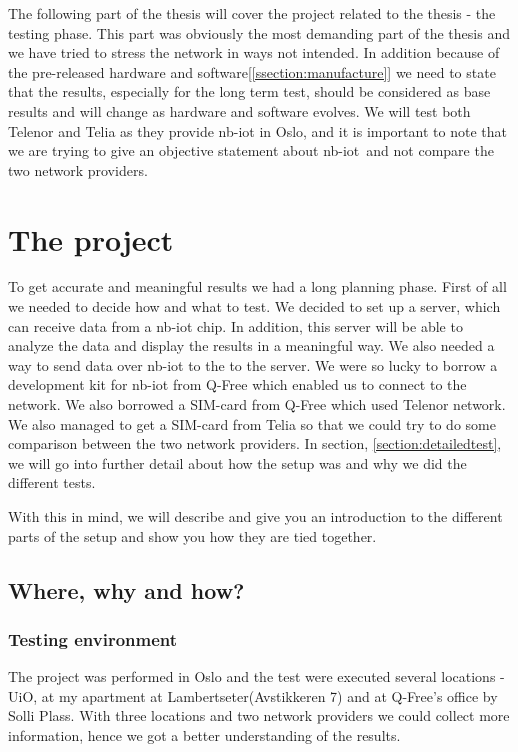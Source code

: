 \documentclass[USenglish]{ifimaster}  %
\begin{document}
The following part of the thesis will cover the project related to the thesis - the testing phase. This part was obviously the most demanding part of the thesis and we have tried to stress the network in ways not intended. In addition because of the pre-released hardware and software[\ref{ssection:manufacture}] we need to state that the results, especially for the long term test, should be considered as base results and will change as hardware and software evolves. We will test both Telenor and Telia as they provide \acrshort{nb-iot} in Oslo, and it is important to note that we are trying to give an objective statement about \acrshort{nb-iot} and not compare the two network providers.

\part{The project}
To get accurate and meaningful results we had a long planning phase. First of all we needed to decide how and what to test. We decided to set up a server, which can receive data from a \acrshort{nb-iot} chip. In addition, this server will be able to analyze the data and display the results in a meaningful way. We also needed a way to send data over \acrshort{nb-iot} to the to the server. We were so lucky to borrow a development kit for \acrshort{nb-iot} from Q-Free which enabled us to connect to the network. We also borrowed a SIM-card from Q-Free which used Telenor network. We also managed to get a SIM-card from Telia so that we could try to do some comparison between the two network providers. In section, \vref{section:detailedtest}, we will go into further detail about how the setup was and why we did the different tests.

With this in mind, we will describe and give you an introduction to the different parts of the setup and show you how they are tied together.

\chapter{Where, why and how?} \label{chapter:wherewhynhow}
\section{Testing environment}
The project was performed in Oslo and the test were executed several locations - UiO, at my apartment at Lambertseter(Avstikkeren 7) and at Q-Free's office by Solli Plass. With three locations and two network providers we could collect more information, hence we got a better understanding of the results.
\end{document}
